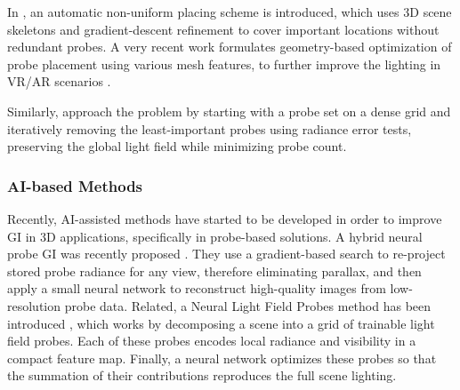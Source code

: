 In \parencite{Wang2019}, an automatic non-uniform placing scheme  is introduced, which uses 3D scene skeletons and gradient-descent refinement to cover important locations without redundant probes. A very recent work formulates geometry-based optimization of probe placement using various mesh features, to further improve the lighting in VR/AR scenarios \parencite{Teuber2024}.

Similarly, \parencite{Vardis2021} approach the problem by starting with a probe set on a dense grid and iteratively removing the least-important probes using radiance error tests, preserving the global light field while minimizing probe count.

\subsubsection*{AI-based Methods}
Recently, AI-assisted methods have started to be developed in order to improve GI in 3D applications, specifically in probe-based solutions. A hybrid neural probe GI was recently proposed \parencite{Guo2022}. They use a gradient-based search to re-project stored probe radiance for any view, therefore eliminating parallax, and then apply a small neural network to reconstruct high-quality images from low-resolution probe data. Related, a Neural Light Field Probes method has been introduced \parencite{You2024}, which works by decomposing a scene into a grid of trainable light field probes. Each of these probes encodes local radiance and visibility in a compact feature map. Finally, a neural network optimizes these probes so that the summation of their contributions reproduces the full scene lighting. 

